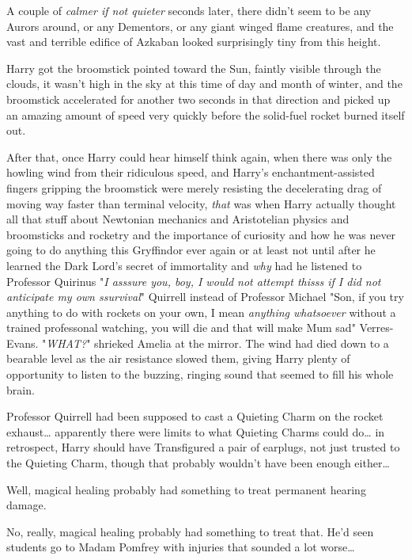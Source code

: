 A couple of \emph{calmer if not quieter} seconds later, there didn't seem to be 
any Aurors around, or any Dementors, or any giant winged flame creatures, and 
the vast and terrible edifice of Azkaban looked surprisingly tiny from this 
height.

Harry got the broomstick pointed toward the Sun, faintly visible through the 
clouds, it wasn't high in the sky at this time of day and month of winter, and 
the broomstick accelerated for another two seconds in that direction and picked 
up an amazing amount of speed very quickly before the solid-fuel rocket burned 
itself out.

After that, once Harry could hear himself think again, when there was only the 
howling wind from their ridiculous speed, and Harry's enchantment-assisted 
fingers gripping the broomstick were merely resisting the decelerating drag of 
moving way faster than terminal velocity, \emph{that} was when Harry actually 
thought all that stuff about Newtonian mechanics and Aristotelian physics and 
broomsticks and rocketry and the importance of curiosity and how he was never 
going to do anything this Gryffindor ever again or at least not until after he 
learned the Dark Lord's secret of immortality and \emph{why} had he listened to 
Professor Quirinus "\emph{I asssure you, boy, I would not attempt thisss if I 
did not anticipate my own ssurvival}" Quirrell instead of Professor Michael 
"Son, if you try anything to do with rockets on your own, I mean \emph{anything 
whatsoever} without a trained professonal watching, you will die and that will 
make Mum sad" Verres-Evans.
\sbreak
"\emph{WHAT?}" shrieked Amelia at the mirror.
\sbreak
The wind had died down to a bearable level as the air resistance slowed them, 
giving Harry plenty of opportunity to listen to the buzzing, ringing sound that 
seemed to fill his whole brain.

Professor Quirrell had been supposed to cast a Quieting Charm on the rocket 
exhaust{\ldots} apparently there were limits to what Quieting Charms could 
do{\ldots} in retrospect, Harry should have Transfigured a pair of earplugs, 
not just trusted to the Quieting Charm, though that probably wouldn't have been 
enough either{\ldots}

Well, magical healing probably had something to treat permanent hearing damage.

No, really, magical healing probably had something to treat that. He'd seen 
students go to Madam Pomfrey with injuries that sounded a lot worse{\ldots}

